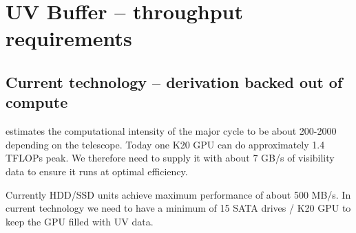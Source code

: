 \documentclass[useAMS,usenatbib,referee]{article}
\begin{document}
\section{UV Buffer -- throughput requirements}

\subsection{Current technology -- derivation backed out of compute}

\cite{MajCycleModel} estimates the computational intensity of the
major cycle to be about 200-2000 depending on the telescope. Today one
K20 GPU can do approximately 1.4 TFLOPs peak. We therefore need to
supply it with about 7 GB/s of visibility data to ensure it runs at
optimal efficiency. 

Currently HDD/SSD units achieve maximum performance of about 500 MB/s.
In current technology we need to have a minimum of 15 SATA drives /
K20 GPU to keep the GPU filled with UV data. 


 

\end{document}

